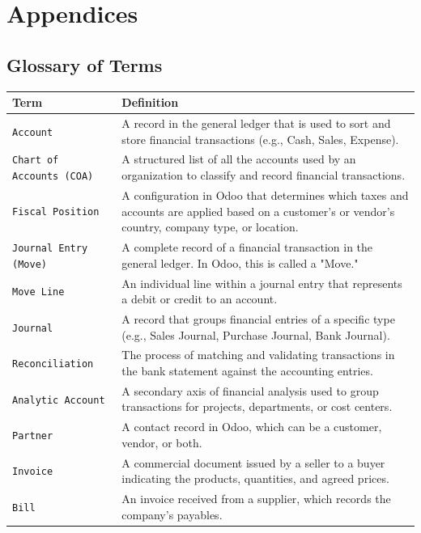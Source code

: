 \documentclass[11pt,a4paper]{article}
\begin{document}
\newpage
\section{Appendices}
\subsection{Glossary of Terms}

\begin{longtable}{|l|p{10cm}|}
    \hline
    \textbf{Term} & \textbf{Definition} \\
    \hline
    \texttt{Account} & A record in the general ledger that is used to sort and store financial transactions (e.g., Cash, Sales, Expense). \\
    \hline
    \texttt{Chart of Accounts (COA)} & A structured list of all the accounts used by an organization to classify and record financial transactions. \\
    \hline
    \texttt{Fiscal Position} & A configuration in Odoo that determines which taxes and accounts are applied based on a customer's or vendor's country, company type, or location. \\
    \hline
    \texttt{Journal Entry (Move)} & A complete record of a financial transaction in the general ledger. In Odoo, this is called a "Move." \\
    \hline
    \texttt{Move Line} & An individual line within a journal entry that represents a debit or credit to an account. \\
    \hline
    \texttt{Journal} & A record that groups financial entries of a specific type (e.g., Sales Journal, Purchase Journal, Bank Journal). \\
    \hline
    \texttt{Reconciliation} & The process of matching and validating transactions in the bank statement against the accounting entries. \\
    \hline
    \texttt{Analytic Account} & A secondary axis of financial analysis used to group transactions for projects, departments, or cost centers. \\
    \hline
    \texttt{Partner} & A contact record in Odoo, which can be a customer, vendor, or both. \\
    \hline
    \texttt{Invoice} & A commercial document issued by a seller to a buyer indicating the products, quantities, and agreed prices. \\
    \hline
    \texttt{Bill} & An invoice received from a supplier, which records the company's payables. \\

\end{longtable}
\end{document}
